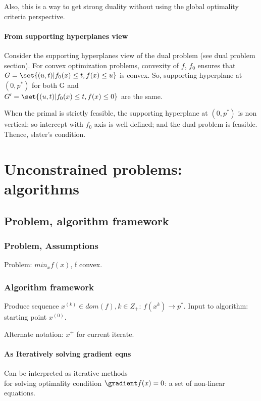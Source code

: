 \documentclass[oneside, article]{memoir}
\begin{document}
 Also, this is a way to get strong duality without using the global optimality criteria perspective.

\subsubsection{From supporting hyperplanes view}
Consider the supporting hyperplanes view of the dual problem (see dual problem section). For convex optimization problems, convexity of $f$, $f_0$ ensures that  $G = \set{(u, t)| f_0(x) \leq t, f(x) \leq u}$ is convex. So, supporting hyperplane at $(0, p^{*})$ for both G and \\$G'=\set{(u, t)| f_0(x) \leq t, f(x) \leq 0}$ are the same. 

When the primal is strictly feasible, the supporting hyperplane at $(0, p^{*})$ is non vertical; so intercept with $f_0$ axis is well defined; and the dual problem is feasible. Thence, slater's condition.

\chapter{Unconstrained problems: algorithms}
\section{Problem, algorithm framework}
\subsection{Problem, Assumptions}
Problem: $min_x f(x)$, f convex.

\subsection{Algorithm framework}
Produce sequence $x^{(k)} \in dom(f), k\in Z_+$: $f(x^{k}) \to p^{*}$. Input to algorithm: starting point $x^{(0)}$.

Alternate notation: $x^{+}$ for current iterate.

\subsubsection{As Iteratively solving gradient eqns}
Can be interpreted as iterative methods\\
 for solving optimality condition $\gradient f(x) = 0$: a set of non-linear equations.
\end{document}
